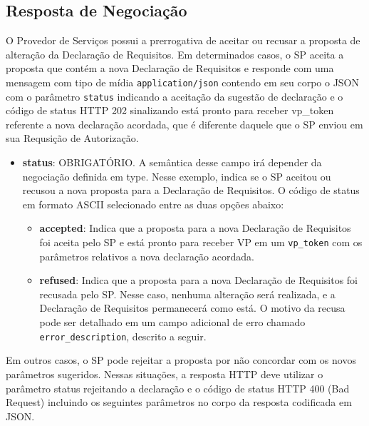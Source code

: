 \subsection{Resposta de Negociação}

O Provedor de Serviços possui a prerrogativa de aceitar ou recusar a proposta de alteração da Declaração de Requisitos. Em determinados casos, o \acs{SP} aceita a proposta que contém a nova Declaração de Requisitos e responde com uma mensagem com tipo de mídia \texttt{application/json} contendo em seu corpo o \acs{JSON} com o parâmetro \texttt{status} indicando a aceitação da sugestão de declaração e o código de status HTTP 202 sinalizando está pronto para receber vp\_token referente a nova declaração acordada, que é diferente daquele que o \acs{SP} enviou em sua Requsição de Autorização. 



\begin{itemize}
    
   \item \textbf{status}: OBRIGATÓRIO. A semântica desse campo irá depender da negociação definida em type. Nesse exemplo, indica se o \acs{SP} aceitou ou recusou a nova proposta para a Declaração de Requisitos. O código de status em formato ASCII selecionado entre as duas opções abaixo:

    \begin{itemize}
        \item \textbf{accepted}: Indica que a proposta para a nova Declaração de Requisitos foi aceita pelo \acs{SP} e está pronto para receber \acs{VP} em um \texttt{vp\_token} com os parâmetros relativos a nova declaração acordada.
        
        \item \textbf{refused}: Indica que a proposta para a nova Declaração de Requisitos foi recusada pelo \acs{SP}. Nesse caso, nenhuma alteração será realizada, e a Declaração de Requisitos permanecerá como está. O motivo da recusa pode ser detalhado em um campo adicional de erro chamado \texttt{error\_description}, descrito a seguir.
    \end{itemize}

\end{itemize}

Em outros casos, o \acs{SP} pode rejeitar a proposta por não concordar com os novos parâmetros sugeridos. Nessas situações, a resposta HTTP deve utilizar o parâmetro status rejeitando a declaração e o código de status HTTP 400 (Bad Request) incluindo os seguintes parâmetros no corpo da resposta codificada em JSON.

